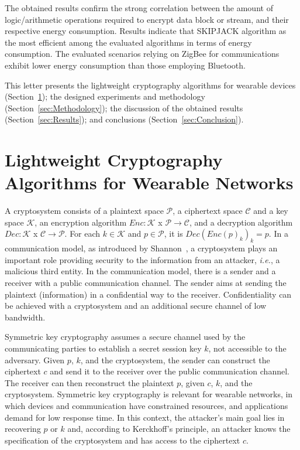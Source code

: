 \documentclass[journal]{IEEEtran}
\newcommand{\gn}[1]{{\color{red}{[#1]}}}
\begin{document}
The obtained results confirm the strong correlation between the amount of logic/arithmetic operations required to encrypt data block or stream, and their respective energy consumption. Results indicate that SKIPJACK algorithm as the most efficient among the evaluated algorithms in terms of energy consumption. %
The evaluated scenarios relying on ZigBee for communications exhibit lower energy consumption than those employing Bluetooth.

This letter presents the lightweight cryptography algorithms for wearable devices (Section~\ref{sec:Background}); the designed experiments and methodology (Section~\ref{sec:Methodology}); the discussion of the obtained results (Section~\ref{sec:Results}); and conclusions (Section~\ref{sec:Conclusion}).


\section{Lightweight Cryptography Algorithms for Wearable Networks}
\label{sec:Background}
%

A cryptosystem consists of a plaintext space $\mathcal{P}$, a ciphertext space $\mathcal{C}$ and a key space $\mathcal{K}$, an encryption algorithm $Enc: \mathcal{K}$ x $\mathcal{P} \rightarrow \mathcal{C}$, and a decryption algorithm $Dec: \mathcal{K}$ x $\mathcal{C} \rightarrow \mathcal{P}$. For each $k \in \mathcal{K}$ and $p \in \mathcal{P}$, it is $Dec(Enc(p)_k)_k = p$. In a communication model, as introduced by Shannon~\cite{shannon}, a cryptosystem plays an important role providing security to the information from an attacker, {\em i.e.}, a malicious third entity. In the communication model, there is a sender and a receiver with a public communication channel. The sender aims at sending the plaintext (information) in a confidential way to the receiver. Confidentiality can be achieved with a cryptosystem and an additional secure channel of low bandwidth.  

Symmetric key cryptography assumes a secure channel used by the communicating parties to establish a secret session key $k$, not accessible to the adversary. Given $p$, $k$, and the cryptosystem, the sender can construct the ciphertext $c$ and send it to the receiver over the public communication channel. The receiver can then reconstruct the plaintext $p$, given $c$, $k$, and the cryptosystem. Symmetric key cryptography is relevant for wearable networks, in which devices and communication have constrained resources, and applications demand for low response time. In this context, the attacker's main goal lies in recovering $p$ or $k$ and, according to Kerckhoff’s principle, an attacker knows the specification of the cryptosystem and has access to the ciphertext $c$. 
\end{document}
